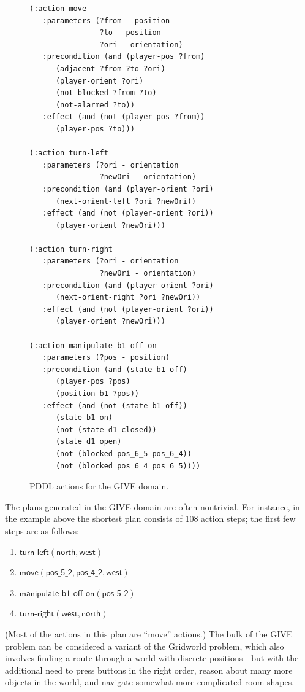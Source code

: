 \begin{figure}[t]
{\small%
\begin{verbatim}
(:action move
   :parameters (?from - position
                ?to - position
                ?ori - orientation)
   :precondition (and (player-pos ?from) 
      (adjacent ?from ?to ?ori) 
      (player-orient ?ori)
      (not-blocked ?from ?to)
      (not-alarmed ?to))
   :effect (and (not (player-pos ?from))
      (player-pos ?to)))

(:action turn-left
   :parameters (?ori - orientation
                ?newOri - orientation)
   :precondition (and (player-orient ?ori)
      (next-orient-left ?ori ?newOri))
   :effect (and (not (player-orient ?ori))
      (player-orient ?newOri)))

(:action turn-right
   :parameters (?ori - orientation
                ?newOri - orientation)
   :precondition (and (player-orient ?ori)
      (next-orient-right ?ori ?newOri))
   :effect (and (not (player-orient ?ori))
      (player-orient ?newOri)))

(:action manipulate-b1-off-on
   :parameters (?pos - position)
   :precondition (and (state b1 off)
      (player-pos ?pos)
      (position b1 ?pos))
   :effect (and (not (state b1 off))
      (state b1 on)
      (not (state d1 closed))
      (state d1 open) 
      (not (blocked pos_6_5 pos_6_4))
      (not (blocked pos_6_4 pos_6_5))))
\end{verbatim}}%
\caption{PDDL actions for the GIVE domain.}
\label{fig:give-planning}
\end{figure}

The plans generated in the GIVE domain are often nontrivial. For instance,
in the example above the shortest plan consists of 108 action steps; the
first few steps are as follows:
%
\begin{enumerate}
\item $\mathsf{turn}\textsf{-}\mathsf{left}(\mathsf{north}, \mathsf{west})$
\item $\mathsf{move}(\mathsf{pos\_5\_2}, \mathsf{pos\_4\_2}, \mathsf{west})$
\item $\mathsf{manipulate}\textsf{-}\mathsf{b1}\textsf{-}\mathsf{off}\textsf{-}\mathsf{on}(\mathsf{pos\_5\_2})$
\item $\mathsf{turn}\textsf{-}\mathsf{right}(\mathsf{west}, \mathsf{north})$
\end{enumerate}
%
(Most of the actions in this plan are ``move'' actions.) The bulk of the
GIVE problem can be considered a variant of the Gridworld problem, which
also involves finding a route through a world with discrete positions---but
with the additional need to press buttons in the right order, reason about
many more objects in the world, and navigate somewhat more complicated room
shapes.

